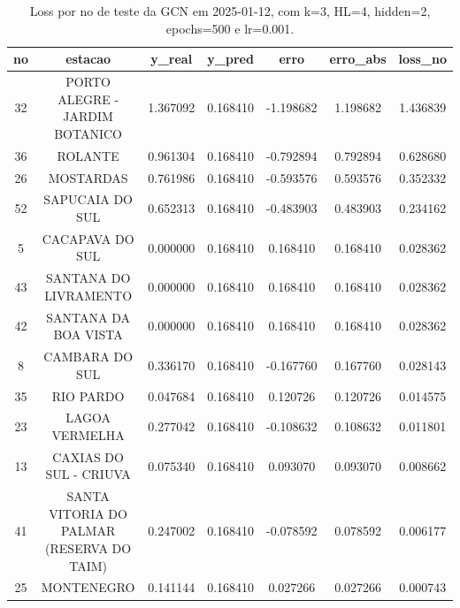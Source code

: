 \begin{table}[h]
\centering
\caption{Loss por no de teste da GCN em 2025-01-12, com k=3, HL=4, hidden=2, epochs=500 e lr=0.001.}
\label{tab:gcn_loss_k3_hl4_h2_e500_d20250112}
\begin{tabular}{ccccccc}
\toprule
no & estacao & y\_real & y\_pred & erro & erro\_abs & loss\_no \\
\midrule
32 & PORTO ALEGRE - JARDIM BOTANICO & 1.367092 & 0.168410 & -1.198682 & 1.198682 & 1.436839 \\
36 & ROLANTE & 0.961304 & 0.168410 & -0.792894 & 0.792894 & 0.628680 \\
26 & MOSTARDAS & 0.761986 & 0.168410 & -0.593576 & 0.593576 & 0.352332 \\
52 & SAPUCAIA DO SUL & 0.652313 & 0.168410 & -0.483903 & 0.483903 & 0.234162 \\
5 & CACAPAVA DO SUL & 0.000000 & 0.168410 & 0.168410 & 0.168410 & 0.028362 \\
43 & SANTANA DO LIVRAMENTO & 0.000000 & 0.168410 & 0.168410 & 0.168410 & 0.028362 \\
42 & SANTANA DA BOA VISTA & 0.000000 & 0.168410 & 0.168410 & 0.168410 & 0.028362 \\
8 & CAMBARA DO SUL & 0.336170 & 0.168410 & -0.167760 & 0.167760 & 0.028143 \\
35 & RIO PARDO & 0.047684 & 0.168410 & 0.120726 & 0.120726 & 0.014575 \\
23 & LAGOA VERMELHA & 0.277042 & 0.168410 & -0.108632 & 0.108632 & 0.011801 \\
13 & CAXIAS DO SUL - CRIUVA & 0.075340 & 0.168410 & 0.093070 & 0.093070 & 0.008662 \\
41 & SANTA VITORIA DO PALMAR (RESERVA DO TAIM) & 0.247002 & 0.168410 & -0.078592 & 0.078592 & 0.006177 \\
25 & MONTENEGRO & 0.141144 & 0.168410 & 0.027266 & 0.027266 & 0.000743 \\
\bottomrule
\end{tabular}
\end{table}
